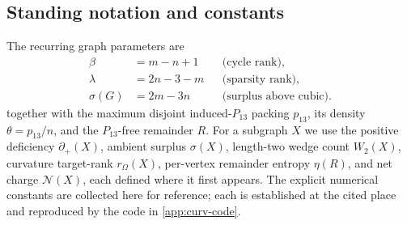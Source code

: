 \documentclass[11pt]{article}
\newcommand{\defp}{\partial_+}
\newcommand{\No}{\mathcal N}
\begin{document}
\subsection*{Standing notation and constants}

The recurring graph parameters are
\[
\begin{aligned}
\beta&=m-n+1 &&\text{(cycle rank)},\\
\lambda&=2n-3-m &&\text{(sparsity rank)},\\
\sigma(G)&=2m-3n &&\text{(surplus above cubic)} .
\end{aligned}
\]
together with the maximum disjoint induced-$P_{13}$ packing $p_{13}$, its density $\theta=p_{13}/n$, and the $P_{13}$-free remainder $R$.  For a subgraph $X$ we use the positive deficiency $\defp(X)$, ambient surplus $\sigma(X)$, length-two wedge count $W_2(X)$, curvature target-rank $r_\Omega(X)$, per-vertex remainder entropy $\eta(R)$, and net charge $\No(X)$, each defined where it first appears.  The explicit numerical constants are collected here for reference; each is established at the cited place and reproduced by the code in \cref{app:curv-code}.
\end{document}
